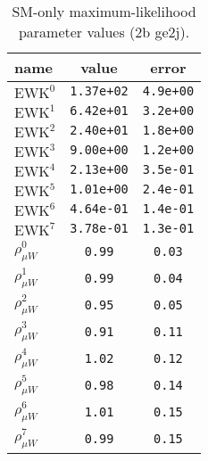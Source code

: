 \documentclass{article}
\begin{document}
\begin{table}\centering
\caption{SM-only maximum-likelihood parameter values (2b ge2j).}
\label{tab:mlParameterValues2b_ge2j}
\begin{tabular}{lcc}name & value & error \\ \hline
$\mathrm{EWK}^{0}$ & {\tt  1.37e+02} & {\tt  4.9e+00}\\
$\mathrm{EWK}^{1}$ & {\tt  6.42e+01} & {\tt  3.2e+00}\\
$\mathrm{EWK}^{2}$ & {\tt  2.40e+01} & {\tt  1.8e+00}\\
$\mathrm{EWK}^{3}$ & {\tt  9.00e+00} & {\tt  1.2e+00}\\
$\mathrm{EWK}^{4}$ & {\tt  2.13e+00} & {\tt  3.5e-01}\\
$\mathrm{EWK}^{5}$ & {\tt  1.01e+00} & {\tt  2.4e-01}\\
$\mathrm{EWK}^{6}$ & {\tt  4.64e-01} & {\tt  1.4e-01}\\
$\mathrm{EWK}^{7}$ & {\tt  3.78e-01} & {\tt  1.3e-01}\\
$\rho_{\mu W}^{0}$ & {\tt 0.99} & {\tt 0.03}\\
$\rho_{\mu W}^{1}$ & {\tt 0.99} & {\tt 0.04}\\
$\rho_{\mu W}^{2}$ & {\tt 0.95} & {\tt 0.05}\\
$\rho_{\mu W}^{3}$ & {\tt 0.91} & {\tt 0.11}\\
$\rho_{\mu W}^{4}$ & {\tt 1.02} & {\tt 0.12}\\
$\rho_{\mu W}^{5}$ & {\tt 0.98} & {\tt 0.14}\\
$\rho_{\mu W}^{6}$ & {\tt 1.01} & {\tt 0.15}\\
$\rho_{\mu W}^{7}$ & {\tt 0.99} & {\tt 0.15}\\
\hline
\end{tabular}
\end{table}
\end{document}
